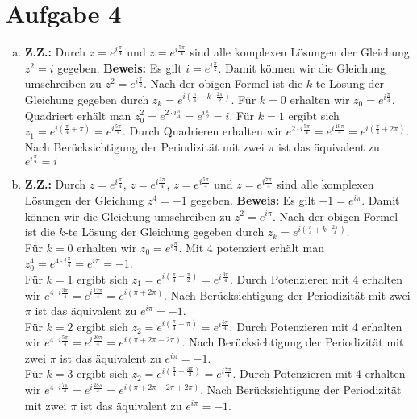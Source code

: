 \documentclass{article}
\begin{document}
\section*{Aufgabe 4}
\begin{enumerate}[(a)]
	\item \textbf{Z.Z.:} Durch $z = e^{i\frac{\pi}{4}}$ und $z = e^{i\frac{5\pi}{4}}$ sind alle komplexen Lösungen der Gleichung $z^2 = i$ gegeben.
	\textbf{Beweis:} Es gilt $i = e^{i\frac{\pi}{2}}$. Damit können wir die Gleichung umschreiben zu $z^2 = e^{i\frac{\pi}{2}}$. Nach der obigen Formel ist die $k$-te Lösung der Gleichung gegeben durch $z_k = e^{i\left(\frac{\pi}{4} + k \cdot \frac{2\pi}{2}\right)}$. 
	Für $k=0$ erhalten wir $z_0 = e^{i\frac{\pi}{4}}$. Quadriert erhält man $z_0^2 = e^{2\cdot i\frac{\pi}{4}} = e^{i\frac{\pi}{2}} = i$.
	Für $k=1$ ergibt sich $z_1 = e^{i\left(\frac{\pi}{4} + \pi\right)} = e^{i\frac{5\pi}{4}}$. Durch Quadrieren erhalten wir $e^{2\cdot i\frac{5\pi}{4}} = e^{i\frac{10\pi}{4}} = e^{i\left(\frac{\pi}{2} + 2\pi\right)}$. Nach Berücksichtigung der Periodizität mit zwei $\pi$ ist das äquivalent zu $e^{i\frac{\pi}{2}} = i$
	\item \textbf{Z.Z.:} Durch $z = e^{i\frac{\pi}{4}}$, $z = e^{i\frac{3\pi}{4}}$, $z = e^{i\frac{5\pi}{4}}$ und $z = e^{i\frac{7\pi}{4}}$ sind alle komplexen Lösungen der Gleichung $z^4 = -1$ gegeben.
	\textbf{Beweis:} Es gilt $-1 = e^{i\pi}$. Damit können wir die Gleichung umschreiben zu $z^2 = e^{i\pi}$. Nach der obigen Formel ist die $k$-te Lösung der Gleichung gegeben durch $z_k = e^{i\left(\frac{\pi}{4} + k \cdot \frac{2\pi}{4}\right)}$.\\
	Für $k=0$ erhalten wir $z_0 = e^{i\frac{\pi}{4}}$. Mit 4 potenziert erhält man $z_0^4 = e^{4\cdot i\frac{\pi}{4}} = e^{i\pi} = -1$.\\
	Für $k=1$ ergibt sich $z_1 = e^{i\left(\frac{\pi}{4} + \frac{\pi}{2}\right)} = e^{i\frac{3\pi}{4}}$. Durch Potenzieren mit 4 erhalten wir $e^{4\cdot i\frac{3\pi}{4}} = e^{i\frac{12\pi}{4}} = e^{i\left(\pi + 2\pi\right)}$. Nach Berücksichtigung der Periodizität mit zwei $\pi$ ist das äquivalent zu $e^{i\pi} = -1$.\\
	Für $k=2$ ergibt sich $z_2 = e^{i\left(\frac{\pi}{4} + \pi\right)} = e^{i\frac{5\pi}{4}}$. 
	Durch Potenzieren mit 4 erhalten wir $e^{4\cdot i\frac{5\pi}{4}} = e^{i\frac{20\pi}{4}} = e^{i\left(\pi + 2\pi + 2\pi\right)}$. Nach Berücksichtigung der Periodizität mit zwei $\pi$ ist das äquivalent zu $e^{i\pi} = -1$.\\
	Für $k=3$ ergibt sich $z_2 = e^{i\left(\frac{\pi}{4} + \frac{3\pi}{2}\right)} = e^{i\frac{7\pi}{4}}$. Durch Potenzieren mit 4 erhalten wir $e^{4\cdot i\frac{7\pi}{4}} = e^{i\frac{28\pi}{4}} = e^{i\left(\pi + 2\pi + 2\pi + 2\pi\right)}$. Nach Berücksichtigung der Periodizität mit zwei $\pi$ ist das äquivalent zu $e^{i\pi} = -1$.

\end{enumerate}
\end{document}
